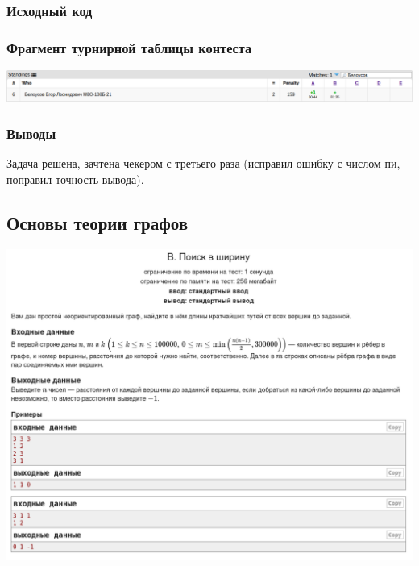 \subsubsection*{Исходный код}


\subsubsection*{Фрагмент турнирной таблицы контеста}
\begin{center}
\includegraphics[width=\textwidth]{standings/20220706/table.png}\newline\noindent
\end{center}

\subsubsection*{Выводы}

Задача решена, зачтена чекером с третьего раза (исправил ошибку с числом пи, поправил точность вывода).

\pagebreak

\subsection*{Основы теории графов}
\begin{center}
\includegraphics[width=\textwidth]{statements/20220707/B.png}
\end{center}
